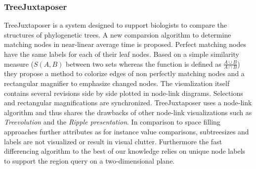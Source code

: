 



\subsubsection{TreeJuxtaposer\cite{munzner2003treejuxtaposer}}
TreeJuxtaposer is a system designed to support biologists to compare the structures of phylogenetic trees. A new comparsion algorithm to determine matching nodes in near-linear average time is proposed. Perfect matching nodes have the same labels for each of their leaf nodes. Based on a simple similarity measure ($S(A,B)$ between two sets whereas the function is defined as $\frac{A \cup B}{A \cap B}$) they propose a method to colorize edges of non perfectly matching nodes and a rectangular magnifier to emphasize changed nodes. The visualization itself contains several revisions side by side plotted in node-link diagrams. Selections and rectangular magnifications are synchronized. TreeJuxtaposer uses a node-link algorithm and thus shares the drawbacks of other node-link visualizations such as \emph{Treevolution} and the \emph{Ripple presentation}. In comparison to space filling approaches further attributes as for instance value comparisons, subtreesizes and labels are not visualized or result in visual clutter. Furthermore the fast differencing algorithm to the best of our knowledge relies on unique node labels to support the region query on a two-dimensional plane.


